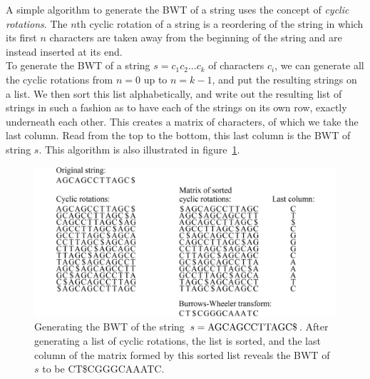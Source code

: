 \documentclass[a4paper,12pt,twoside,BCOR=10mm]{scrbook}
\begin{document}
A simple algorithm to generate the BWT of a string uses 
the concept of \textit{cyclic rotations}. 
The $ n $th cyclic rotation of a string is a reordering of the string in which its first $ n $ characters 
are taken away from the beginning of the string and are instead inserted at its end. \\
To generate the BWT of a string $ s = c_1 c_2 ... c_k $ of characters $ c_i $, 
we can generate all the cyclic rotations from $ n = 0 $ up to $ n = k - 1 $, and 
put the resulting strings on a list. 
We then sort this list alphabetically, and write out the resulting list of strings 
in such a fashion as to have each of the strings on its own row, exactly underneath each other. 
This creates a matrix of characters, of which we take the last column. 
Read from the top to the bottom, this last column is the BWT of string $ s $. 
This algorithm is also illustrated in figure~\ref{fig:evo_fig_bwt_with_cyclic_rotations}.

\begin{figure}[!htb]
\centering
\includegraphics[width=\textwidth]{evo_fig_bwt_with_cyclic_rotations.png}
\caption[Generating the BWT of a string]{Generating the BWT of the string $ s = \textup{AGCAGCCTTAGC\$} $. After generating a list of cyclic rotations, the list is sorted, and the last column of the matrix formed by this sorted list reveals the BWT of $ s $ to be \textup{CT\$CGGGCAAATC}.} \label{fig:evo_fig_bwt_with_cyclic_rotations}
\end{figure}
\end{document}
